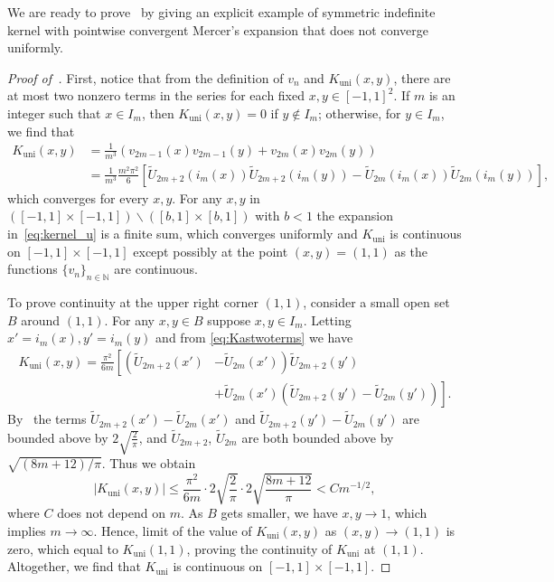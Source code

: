 \documentclass{article}
\begin{document}
We are ready to prove~ by giving an explicit example of symmetric indefinite kernel with pointwise convergent Mercer's expansion that does not converge uniformly. 
\begin{proof}[Proof of~]
First, notice that from the definition of $v_n$ and $K_{\text{uni}}(x, y)$, there are at most two nonzero terms in the series for each fixed $x, y\in[-1, 1]^2$. If $m$ is an integer such that $x\in I_m$, then $K_{\text{uni}}(x,y) = 0$ if $y\notin I_m$; otherwise, for $y\in I_m$, we find that
\begin{align}\nonumber
    K_{\text{uni}}(x, y) &= \frac{1}{m^3}(v_{2m-1}(x) v_{2m-1}(y) + v_{2m}(x)v_{2m}(y)) \\ \label{eq:Kastwoterms}
    &= \frac{1}{m^3} \frac{m^2\pi^2}{6} \left[\tilde{U}_{2m+2}(i_m(x)) \tilde{U}_{2m+2}(i_m(y)) - \tilde{U}_{2m}(i_m(x)) \tilde{U}_{2m}(i_m(y))\right],
\end{align}
which converges for every $x, y$. For any $x, y$ in $([-1, 1]\times [-1, 1])\backslash ([b, 1]\times [b, 1])$ with $b<1$ the expansion in~\cref{eq:kernel_u} is a finite sum, which converges uniformly and $K_{\text{uni}}$ is continuous on $[-1, 1]\times [-1, 1]$ except possibly at the point $(x, y) = (1, 1)$ as the functions $\{v_n\}_{n\in\mathbb{N}}$ are continuous. 

To prove continuity at the upper right corner $(1, 1)$, consider a small open set $B$ around $(1, 1)$. For any $x, y\in B$ suppose $x, y\in I_m$. Letting $x' = i_m(x), y' = i_m(y)$ and from \cref{eq:Kastwoterms} we have
\begin{align*}
    K_{\text{uni}}(x, y) = \frac{\pi^2}{6m} \left[\left(\tilde{U}_{2m+2}(x') \right.\right.&\left.-\tilde{U}_{2m}(x')\right)  \tilde{U}_{2m+2}(y') \\ 
    & + \left.\tilde{U}_{2m}(x')\left(\tilde{U}_{2m+2}(y') - \tilde{U}_{2m}(y')\right)\right].
\end{align*}
By~ the terms $\tilde{U}_{2m+2}(x')-\tilde{U}_{2m}(x')$ and $\tilde{U}_{2m+2}(y') - \tilde{U}_{2m}(y')$ are bounded above by $2\sqrt{\frac{2}{\pi}}$, and $\tilde{U}_{2m+2}$, $\tilde{U}_{2m}$ are both bounded above by $\sqrt{(8m+12)/\pi}$. Thus we obtain
\begin{equation*}
    |K_{\text{uni}}(x, y)| \leq \frac{\pi^2}{6m}\cdot 2\sqrt{\frac{2}{\pi}} \cdot 2 \sqrt{\frac{8m+12}{\pi}} < C m^{-1/2},
\end{equation*}
where $C$ does not depend on $m$. As $B$ gets smaller, we have $x, y\to 1$, which implies $m\to\infty$. Hence, limit of the value of $K_{\text{uni}}(x,y)$ as $(x, y)\to (1,1)$ is zero, which equal to $K_{\text{uni}}(1, 1)$, proving the continuity of $K_{\text{uni}}$ at $(1, 1)$. Altogether, we find that $K_{\text{uni}}$ is continuous on $[-1, 1]\times [-1, 1]$. 


\end{proof}
\end{document}
